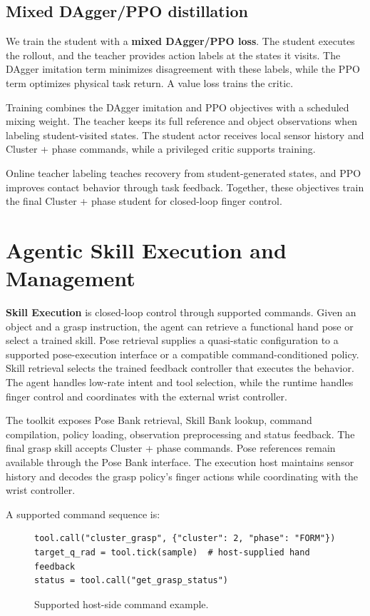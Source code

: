 \documentclass[10pt,twocolumn]{article}
\begin{document}
\subsection{Mixed DAgger/PPO distillation}

We train the student with a \textbf{mixed DAgger/PPO loss}. The student executes the rollout, and the teacher provides action labels at the states it visits. The DAgger imitation term minimizes disagreement with these labels, while the PPO term optimizes physical task return. A value loss trains the critic.

Training combines the DAgger imitation and PPO objectives with a scheduled mixing weight. The teacher keeps its full reference and object observations when labeling student-visited states. The student actor receives local sensor history and Cluster + phase commands, while a privileged critic supports training.

Online teacher labeling teaches recovery from student-generated states, and PPO improves contact behavior through task feedback. Together, these objectives train the final Cluster + phase student for closed-loop finger control.

\section{Agentic Skill Execution and Management}

\textbf{Skill Execution} is closed-loop control through supported commands. Given an object and a grasp instruction, the agent can retrieve a functional hand pose or select a trained skill. Pose retrieval supplies a quasi-static configuration to a supported pose-execution interface or a compatible command-conditioned policy. Skill retrieval selects the trained feedback controller that executes the behavior. The agent handles low-rate intent and tool selection, while the runtime handles finger control and coordinates with the external wrist controller.

The toolkit exposes Pose Bank retrieval, Skill Bank lookup, command compilation, policy loading, observation preprocessing and status feedback. The final grasp skill accepts Cluster + phase commands. Pose references remain available through the Pose Bank interface. The execution host maintains sensor history and decodes the grasp policy's finger actions while coordinating with the wrist controller.

A supported command sequence is:

\begin{figure}[t]
\small\begin{verbatim}
tool.call("cluster_grasp", {"cluster": 2, "phase": "FORM"})
target_q_rad = tool.tick(sample)  # host-supplied hand feedback
status = tool.call("get_grasp_status")
\end{verbatim}
\caption*{Supported host-side command example.}
\end{figure}
\end{document}
